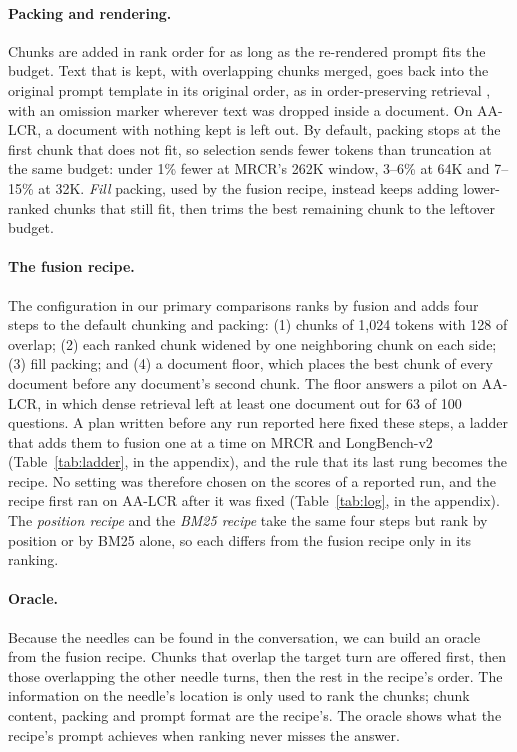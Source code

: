 \documentclass[letterpaper]{article} %
\newcommand{\recipe}{fusion recipe}
\begin{document}
\paragraph{Packing and rendering.} Chunks are added in rank order for as long as the re-rendered prompt fits the budget. Text that is kept, with overlapping chunks merged, goes back into the original prompt template in its original order, as in order-preserving retrieval \cite{yu2024oprag,laitenberger2025dosrag}, with an omission marker wherever text was dropped inside a document. On AA-LCR, a document with nothing kept is left out. By default, packing stops at the first chunk that does not fit, so selection sends fewer tokens than truncation at the same budget: under 1\% fewer at MRCR's 262K window, 3--6\% at 64K and 7--15\% at 32K. \emph{Fill} packing, used by the \recipe, instead keeps adding lower-ranked chunks that still fit, then trims the best remaining chunk to the leftover budget.

\paragraph{The \recipe.} The configuration in our primary comparisons ranks by fusion and adds four steps to the default chunking and packing: (1) chunks of 1,024 tokens with 128 of overlap; (2) each ranked chunk widened by one neighboring chunk on each side; (3) fill packing; and (4) a document floor, which places the best chunk of every document before any document's second chunk. The floor answers a pilot on AA-LCR, in which dense retrieval left at least one document out for 63 of 100 questions. A plan written before any run reported here fixed these steps, a ladder that adds them to fusion one at a time on MRCR and LongBench-v2 (Table~\ref{tab:ladder}, in the appendix), and the rule that its last rung becomes the recipe. No setting was therefore chosen on the scores of a reported run, and the recipe first ran on AA-LCR after it was fixed (Table~\ref{tab:log}, in the appendix). The \emph{position recipe} and the \emph{BM25 recipe} take the same four steps but rank by position or by BM25 alone, so each differs from the \recipe{} only in its ranking.

\paragraph{Oracle.} Because the needles can be found in the conversation, we can build an oracle from the \recipe. Chunks that overlap the target turn are offered first, then those overlapping the other needle turns, then the rest in the recipe's order. The information on the needle's location is only used to rank the chunks; chunk content, packing and prompt format are the recipe's. The oracle shows what the recipe's prompt achieves when ranking never misses the answer.
\end{document}
